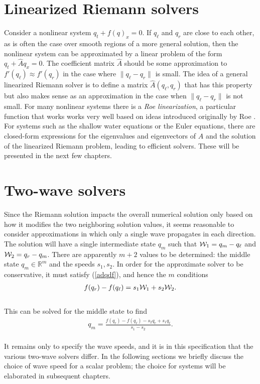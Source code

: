 \documentclass{SIAMbook2016}
\begin{document}
\hypertarget{linearized-riemann-solvers}{%
\section{Linearized Riemann solvers}\label{linearized-riemann-solvers}}

Consider a nonlinear system \(q_t + f(q)_x = 0\). If \(q_\ell\) and
\(q_r\) are close to each other, as is often the case over smooth
regions of a more general solution, then the nonlinear system can be
approximated by a linear problem of the form \(q_t + \hat A q_x = 0\).
The coefficient matrix \(\hat A\) should be some approximation to
\(f'(q_\ell) \approx f'(q_r)\) in the case where \(\|q_\ell-q_r\|\) is
small. The idea of a general linearized Riemann solver is to define a
matrix \(\hat A(q_\ell, q_r)\) that has this property but also makes
sense as an approximation in the case when \(\|q_\ell-q_r\|\) is not
small. For many nonlinear systems there is a \emph{Roe linearization}, a
particular function that works works very well based on ideas introduced
originally by Roe \cite{Roe1981}. For systems such as the shallow water
equations or the Euler equations, there are closed-form expressions for
the eigenvalues and eigenvectors of \(\hat A\) and the solution of the
linearized Riemann problem, leading to efficient solvers. These will be
presented in the next few chapters.

\hypertarget{two-wave-solvers}{%
\section{Two-wave solvers}\label{two-wave-solvers}}

Since the Riemann solution impacts the overall numerical solution only
based on how it modifies the two neighboring solution values, it seems
reasonable to consider approximations in which only a single wave
propagates in each direction. The solution will have a single
intermediate state \(q_m\) such that \({\cal W}_1 = q_m - q_\ell\) and
\({\cal W}_2 = q_r-q_m\). There are apparently \(m+2\) values to be
determined: the middle state \(q_m \in {\mathbb R}^m\) and the speeds
\(s_1, s_2\). In order for the approximate solver to be conservative, it
must satisfy (\ref{adqdf}), and hence the \(m\) conditions\\
\begin{align}
f(q_r) - f(q_\ell) = s_1 {\cal W}_1 + s_2 {\cal W}_2.
\end{align}\\
This can be solved for the middle state to find\\
\begin{align}  \label{AS:middle_state}
q_m = \frac{f(q_r) - f(q_\ell) - s_2 q_r + s_1 q_\ell}{s_1 - s_2}.
\end{align}\\
It remains only to specify the wave speeds, and it is in this
specification that the various two-wave solvers differ. In the following
sections we briefly discuss the choice of wave speed for a scalar
problem; the choice for systems will be elaborated in subsequent
chapters.
\end{document}
